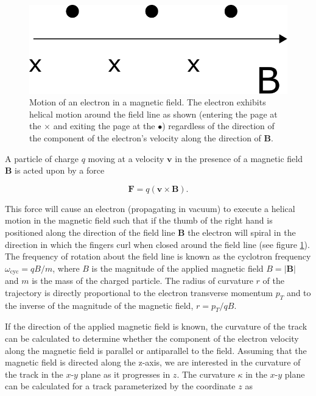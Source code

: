 \documentclass{JINST}
\begin{document}
\begin{figure}[!htb]
	\centering
	\includegraphics[scale=0.5]{fig/bfield_motion.pdf}
	\caption{\label{fig_bfieldmotion}Motion of an electron in a magnetic field.  The electron exhibits helical motion around the field line as shown (entering the page at the $\times$ and exiting the page at the $\bullet$) regardless of the direction of the component of the electron's velocity along the direction of $\mathbf{B}$.}
\end{figure}

A particle of charge $q$ moving at a velocity $\mathbf{v}$ in the presence of a magnetic field $\mathbf{B}$ is acted upon by a force

\begin{equation}\label{eqn_Bmotion}
\mathbf{F} = q(\mathbf{v} \times \mathbf{B}).
\end{equation}

\noindent This force will cause an electron (propagating in vacuum) to execute a helical motion in the magnetic field such that if the thumb of the right hand is positioned along the direction of the field line $\mathbf{B}$ the electron will spiral in the direction in which the fingers curl when closed around the field line (see figure \ref{fig_bfieldmotion}).  The frequency of rotation about the field line is known as the cyclotron frequency $\omega_{\mathrm{cyc}} = qB/m$, where $B$ is the magnitude of the applied magnetic field $B = |\mathbf{B}|$ and $m$ is the mass of the charged particle. The radius of curvature $r$ of the trajectory is directly proportional to the electron transverse momentum $p_{T}$ and to the inverse of the magnitude of the magnetic field, $r = p_{T}/qB$.

If the direction of the applied magnetic field is known, the curvature of the track can be calculated to determine whether the component of the electron velocity along the magnetic field is parallel or antiparallel to the field.  Assuming that the magnetic field is directed along the z-axis, we are interested in the curvature of the track in the $x$-$y$ plane as it progresses in $z$.  The curvature $\kappa$ in the $x$-$y$ plane can be calculated for a track parameterized by the coordinate $z$ as
\end{document}
